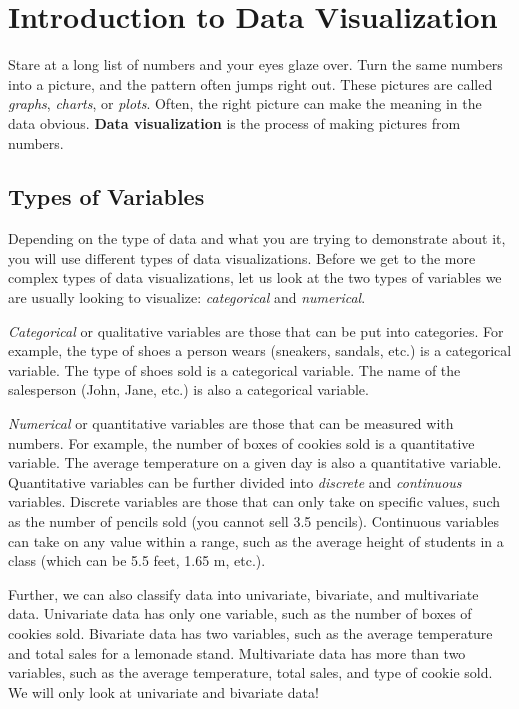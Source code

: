 \chapter{Introduction to Data Visualization}

Stare at a long list of numbers and your eyes glaze over. Turn the same numbers into a picture, and the pattern often jumps right out. These pictures are called \textit{graphs},
\textit{charts}, or \textit{plots}. Often, the right picture can make
the meaning in the data obvious. \textbf{Data visualization} is the process of making pictures from numbers.

\section{Types of Variables}

Depending on the type of data and what you are trying to demonstrate
about it, you will use different types of data visualizations. Before we get to the more complex types of data visualizations, let us
look at the two types of variables we are usually looking to visualize: \textit{categorical} and \textit{numerical}.

\textit{Categorical} or qualitative variables are those that can be put into categories. For example, the type of shoes a person wears
(sneakers, sandals, etc.) is a categorical variable. The type of shoes sold is a categorical variable. The name of the salesperson (John, Jane, etc.) is also a categorical variable.

\textit{Numerical} or quantitative variables are those that can be measured with numbers. For example, the number of boxes of cookies
sold is a quantitative variable. The average temperature on a given day is also a quantitative variable. Quantitative variables can be
further divided into \textit{discrete} and \textit{continuous} variables. Discrete variables are those that can only take on specific values,
such as the number of pencils sold (you cannot sell 3.5 pencils). Continuous variables can take on any value within a range,
such as the average height of students in a class (which can be 5.5 feet, 1.65 m, etc.).

Further, we can also classify data into univariate, bivariate, and multivariate data. Univariate data has only one variable,
such as the number of boxes of cookies sold. Bivariate data has two variables, such as the average temperature and total sales
for a lemonade stand. Multivariate data has more than two variables, such as the average temperature, total sales, and type of
cookie sold. We will only look at univariate and bivariate data!

